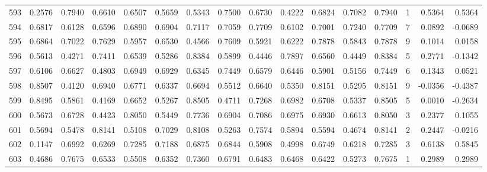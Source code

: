 \begin{tabular}{lrrrrrrrrrrrrrrr}
593 &      0.2576 &  0.7940 &  0.6610 &  0.6507 &  0.5659 &  0.5343 &  0.7500 &  0.6730 &  0.4222 &  0.6824 &   0.7082 &     0.7940 &      1 &                    0.5364 &                     0.5364 \\
594 &      0.6817 &  0.6128 &  0.6596 &  0.6890 &  0.6904 &  0.7117 &  0.7059 &  0.7709 &  0.6102 &  0.7001 &   0.7240 &     0.7709 &      7 &                    0.0892 &                    -0.0689 \\
595 &      0.6864 &  0.7022 &  0.7629 &  0.5957 &  0.6530 &  0.4566 &  0.7609 &  0.5921 &  0.6222 &  0.7878 &   0.5843 &     0.7878 &      9 &                    0.1014 &                     0.0158 \\
596 &      0.5613 &  0.4271 &  0.7411 &  0.6539 &  0.5286 &  0.8384 &  0.5899 &  0.4446 &  0.7897 &  0.6560 &   0.4449 &     0.8384 &      5 &                    0.2771 &                    -0.1342 \\
597 &      0.6106 &  0.6627 &  0.4803 &  0.6949 &  0.6929 &  0.6345 &  0.7449 &  0.6579 &  0.6446 &  0.5901 &   0.5156 &     0.7449 &      6 &                    0.1343 &                     0.0521 \\
598 &      0.8507 &  0.4120 &  0.6940 &  0.6771 &  0.6337 &  0.6694 &  0.5512 &  0.6640 &  0.5350 &  0.8151 &   0.5295 &     0.8151 &      9 &                   -0.0356 &                    -0.4387 \\
599 &      0.8495 &  0.5861 &  0.4169 &  0.6652 &  0.5267 &  0.8505 &  0.4711 &  0.7268 &  0.6982 &  0.6708 &   0.5337 &     0.8505 &      5 &                    0.0010 &                    -0.2634 \\
600 &      0.5673 &  0.6728 &  0.4423 &  0.8050 &  0.5449 &  0.7736 &  0.6904 &  0.7086 &  0.6975 &  0.6930 &   0.6613 &     0.8050 &      3 &                    0.2377 &                     0.1055 \\
601 &      0.5694 &  0.5478 &  0.8141 &  0.5108 &  0.7029 &  0.8108 &  0.5263 &  0.7574 &  0.5894 &  0.5594 &   0.4674 &     0.8141 &      2 &                    0.2447 &                    -0.0216 \\
602 &      0.1147 &  0.6992 &  0.6269 &  0.7285 &  0.7188 &  0.6875 &  0.6844 &  0.5908 &  0.4998 &  0.6749 &   0.6218 &     0.7285 &      3 &                    0.6138 &                     0.5845 \\
603 &      0.4686 &  0.7675 &  0.6533 &  0.5508 &  0.6352 &  0.7360 &  0.6791 &  0.6483 &  0.6468 &  0.6422 &   0.5273 &     0.7675 &      1 &                    0.2989 &                     0.2989 \\

\end{tabular}
